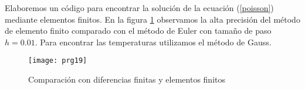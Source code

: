 \documentclass[10pt,a4paper]{article}
\begin{document}
Elaboremos un c\'odigo para encontrar la soluci\'on de la ecuaci\'on (\ref{poisson}) mediante elementos finitos. En la figura \ref{gefinito} observamos la alta precisi\'on del m\'etodo de elemento finito comparado con el m\'etodo de Euler con tama\~no de paso $h=0.01$. Para encontrar las temperaturas utilizamos el m\'etodo de Gauss.

\begin{figure}[htb]
  \centering
  \texttt{[image: prg19]}
  \caption{Comparaci\'on con diferencias finitas y elementos finitos}
  \label{gefinito}
\end{figure}

  \bigskip















\end{document}

